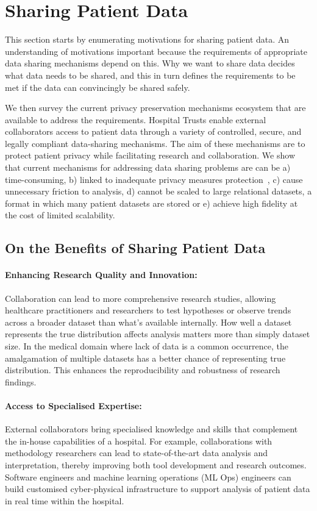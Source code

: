 \documentclass[11pt]{article}
\begin{document}
\section{Sharing Patient Data}

This section starts by enumerating motivations for sharing patient data. An understanding of motivations important because the requirements of appropriate data sharing mechanisms depend on this. Why we want to share data decides what data needs to be shared, and this in turn defines the requirements to be met if the data can convincingly be shared safely.

We then survey the current privacy preservation mechanisms ecosystem that are available to address the requirements. Hospital Trusts enable external collaborators access to patient data through a variety of controlled, secure, and legally compliant data-sharing mechanisms. The aim of these mechanisms are to protect patient privacy while facilitating research and collaboration. We show that current mechanisms for addressing data sharing problems are can be a) time-consuming, b) linked to inadequate privacy measures protection~\cite{near2021}\cite{tucker2020}, c) cause unnecessary friction to analysis\cite{ODonovan2023}, d) cannot be scaled to large relational datasets, a format in which many patient datasets are stored or e) achieve high fidelity at the cost of limited scalability\cite{Cai2023}.

\subsection{On the Benefits of Sharing Patient Data}

\paragraph{Enhancing Research Quality and Innovation:} 
Collaboration can lead to more comprehensive research studies, allowing healthcare practitioners and researchers to test hypotheses or observe trends across a broader dataset than what's available internally. How well a dataset represents the true distribution affects analysis matters more than simply dataset size\cite{app11020796}. In the medical domain where lack of data is a common occurrence, the amalgamation of multiple datasets has a better chance of representing true distribution. This enhances the reproducibility and robustness of research findings.

\paragraph{Access to Specialised Expertise:} 
External collaborators bring specialised knowledge and skills that complement the in-house capabilities of a hospital. For example, collaborations with methodology researchers can lead to state-of-the-art data analysis and interpretation, thereby improving both tool development and research outcomes. Software engineers and machine learning operations (ML Ops) engineers can build customised cyber-physical infrastructure to support analysis of patient data in real time within the hospital\cite{harris2022}.
\end{document}

